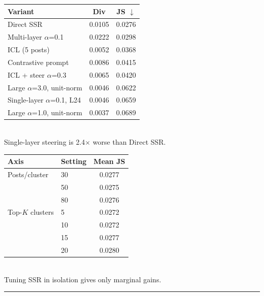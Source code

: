 \documentclass[10pt,a4paper]{article}
\begin{document}
\begin{minipage}[t]{0.48\textwidth}
\vspace{-4pt}
\centering\small
\begin{tabular}{@{}lcc@{}}
\toprule
Variant & Div & JS $\downarrow$ \\
\midrule
\rowcolor{bestrow} Direct SSR & 0.0105 & 0.0276 \\
Multi-layer $\alpha$=0.1 & 0.0222 & 0.0298 \\
ICL (5 posts) & 0.0052 & 0.0368 \\
Contrastive prompt & 0.0086 & 0.0415 \\
ICL + steer $\alpha$=0.3 & 0.0065 & 0.0420 \\
Large $\alpha$=3.0, unit-norm & 0.0046 & 0.0622 \\
Single-layer $\alpha$=0.1, L24 & 0.0046 & 0.0659 \\
Large $\alpha$=1.0, unit-norm & 0.0037 & 0.0689 \\
\bottomrule
\end{tabular}
\\[2pt]
{\scriptsize Single-layer steering is 2.4$\times$ worse than Direct SSR.}
\end{minipage}
\hfill
\begin{minipage}[t]{0.48\textwidth}
\vspace{-4pt}
\centering\small
\begin{tabular}{@{}llc@{}}
\toprule
Axis & Setting & Mean JS \\
\midrule
Posts/cluster & 30 & 0.0277 \\
 & 50 & 0.0275 \\
 & 80 & 0.0276 \\
\midrule
Top-$K$ clusters & 5 & 0.0272 \\
 & 10 & 0.0272 \\
 & 15 & 0.0277 \\
 & 20 & 0.0280 \\
\bottomrule
\end{tabular}
\\[2pt]
{\scriptsize Tuning SSR in isolation gives only marginal gains.}
\end{minipage}

\vspace{10pt}
\hrule
\vspace{4pt}
\end{document}
